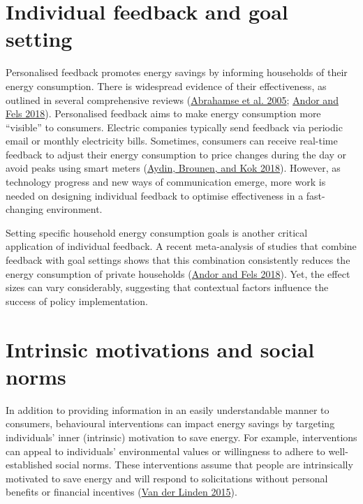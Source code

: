 \documentclass[
  12pt,
  captions=heading]{scrreport}
\begin{document}
\hypertarget{individual-feedback-and-goal-setting}{%
\section{Individual feedback and goal
setting}\label{individual-feedback-and-goal-setting}}

Personalised feedback promotes energy savings by informing households of
their energy consumption. There is widespread evidence of their
effectiveness, as outlined in several comprehensive reviews
(\protect\hyperlink{ref-abrahamse2005review}{Abrahamse et al. 2005};
\protect\hyperlink{ref-andor2018behavioral}{Andor and Fels 2018}).
Personalised feedback aims to make energy consumption more ``visible''
to consumers. Electric companies typically send feedback via periodic
email or monthly electricity bills. Sometimes, consumers can receive
real-time feedback to adjust their energy consumption to price changes
during the day or avoid peaks using smart meters
(\protect\hyperlink{ref-aydin2018information}{Aydin, Brounen, and Kok
2018}). However, as technology progress and new ways of communication
emerge, more work is needed on designing individual feedback to optimise
effectiveness in a fast-changing environment.

Setting specific household energy consumption goals is another critical
application of individual feedback. A recent meta-analysis of studies
that combine feedback with goal settings shows that this combination
consistently reduces the energy consumption of private households
(\protect\hyperlink{ref-andor2018behavioral}{Andor and Fels 2018}). Yet,
the effect sizes can vary considerably, suggesting that contextual
factors influence the success of policy implementation.

\hypertarget{intrinsic-motivations-and-social-norms}{%
\section{Intrinsic motivations and social
norms}\label{intrinsic-motivations-and-social-norms}}

In addition to providing information in an easily understandable manner
to consumers, behavioural interventions can impact energy savings by
targeting individuals' inner (intrinsic) motivation to save energy. For
example, interventions can appeal to individuals' environmental values
or willingness to adhere to well-established social norms. These
interventions assume that people are intrinsically motivated to save
energy and will respond to solicitations without personal benefits or
financial incentives (\protect\hyperlink{ref-van2015social}{Van der
Linden 2015}).
\end{document}

